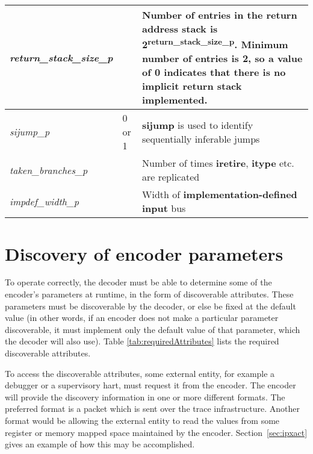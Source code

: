 \begin{table}[h]
\begin{tabulary}{\textwidth}{|l|l|p{100mm}|}
        \hline
        \textit{return\_stack\_size\_p} &  & Number of entries in the return address stack is 2\textsuperscript{\textbf{return\_stack\_size\_p}}.
                                    Minimum number of entries is 2, so a value of 0 indicates that there is no implicit return stack implemented.\\
        \hline
        \textit{sijump\_p} & 0 or 1 & \textbf{sijump} is used to identify sequentially inferable jumps\\
        \hline
        \textit{taken\_branches\_p} & & Number of times \textbf{iretire}, \textbf{itype} etc. are replicated\\
        \hline
        \textit{impdef\_width\_p} & & Width of \textbf{implementation-defined input} bus \\
        \hline
    \end{tabulary}
\end{table}
\FloatBarrier

\section {Discovery of encoder parameters} \label{sec:disco}

To operate correctly, the decoder must be able to determine some of the encoder's parameters 
at runtime, in the form of discoverable attributes.  These parameters must be discoverable by the 
decoder, or else be fixed at the default value (in other words, if an encoder does not make a 
particular parameter discoverable, it must implement only the default value of that parameter, 
which the decoder will also use).  Table \ref{tab:requiredAttributes} lists the required 
discoverable attributes.

To access the discoverable attributes, some external entity, for example a debugger or a 
supervisory hart, must request it from the encoder. The encoder will
provide the discovery information in one or more different formats.  
The preferred format is a packet which is sent over the trace infrastructure.
Another format would be allowing the external entity to read the
values from some register or memory mapped space maintained by the encoder.
Section~\ref{sec:ipxact} gives an example of how this may be accomplished.

